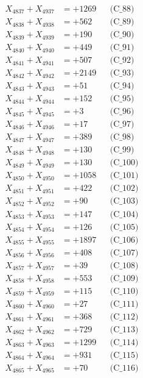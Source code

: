 \documentclass[a4paper,10pt]{article}
\begin{document}
{\begin{align}
X_{4837} + X_{4937} &= +1269 && \text{(C\_88)} \\
X_{4838} + X_{4938} &= +562 && \text{(C\_89)} \\
X_{4839} + X_{4939} &= +190 && \text{(C\_90)} \\
\allowbreak
X_{4840} + X_{4940} &= +449 && \text{(C\_91)} \\
X_{4841} + X_{4941} &= +507 && \text{(C\_92)} \\
X_{4842} + X_{4942} &= +2149 && \text{(C\_93)} \\
X_{4843} + X_{4943} &= +51 && \text{(C\_94)} \\
X_{4844} + X_{4944} &= +152 && \text{(C\_95)} \\
\allowbreak
X_{4845} + X_{4945} &= +3 && \text{(C\_96)} \\
X_{4846} + X_{4946} &= +17 && \text{(C\_97)} \\
X_{4847} + X_{4947} &= +389 && \text{(C\_98)} \\
X_{4848} + X_{4948} &= +130 && \text{(C\_99)} \\
X_{4849} + X_{4949} &= +130 && \text{(C\_100)} \\
\allowbreak
X_{4850} + X_{4950} &= +1058 && \text{(C\_101)} \\
X_{4851} + X_{4951} &= +422 && \text{(C\_102)} \\
X_{4852} + X_{4952} &= +90 && \text{(C\_103)} \\
X_{4853} + X_{4953} &= +147 && \text{(C\_104)} \\
X_{4854} + X_{4954} &= +126 && \text{(C\_105)} \\
\allowbreak
X_{4855} + X_{4955} &= +1897 && \text{(C\_106)} \\
X_{4856} + X_{4956} &= +408 && \text{(C\_107)} \\
X_{4857} + X_{4957} &= +39 && \text{(C\_108)} \\
X_{4858} + X_{4958} &= +553 && \text{(C\_109)} \\
X_{4859} + X_{4959} &= +115 && \text{(C\_110)} \\
\allowbreak
X_{4860} + X_{4960} &= +27 && \text{(C\_111)} \\
X_{4861} + X_{4961} &= +368 && \text{(C\_112)} \\
X_{4862} + X_{4962} &= +729 && \text{(C\_113)} \\
X_{4863} + X_{4963} &= +1299 && \text{(C\_114)} \\
X_{4864} + X_{4964} &= +931 && \text{(C\_115)} \\
\allowbreak
X_{4865} + X_{4965} &= +70 && \text{(C\_116)} \\

\end{align}}
\end{document}
